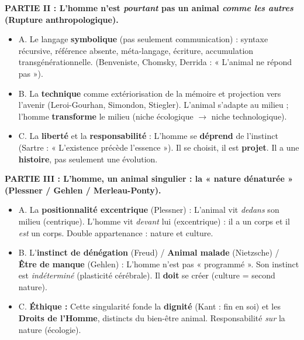 \documentclass[11pt]{article}
\begin{document}
\begin{exoresolu}
\textbf{PARTIE II : L'homme n'est \emph{pourtant} pas un animal \emph{comme les autres} (Rupture anthropologique).}
\begin{itemize}
    \item A. Le langage \textbf{symbolique} (pas seulement communication) : syntaxe récursive, référence absente, méta-langage, écriture, accumulation transgénérationnelle. (Benveniste, Chomsky, Derrida : « L'animal ne répond pas »).
    \item B. La \textbf{technique} comme extériorisation de la mémoire et projection vers l'avenir (Leroi-Gourhan, Simondon, Stiegler). L'animal s'adapte au milieu ; l'homme \textbf{transforme} le milieu (niche écologique $\rightarrow$ niche technologique).
    \item C. La \textbf{liberté} et la \textbf{responsabilité} : L'homme se \textbf{déprend} de l'instinct (Sartre : « L'existence précède l'essence »). Il se choisit, il est \textbf{projet}. Il a une \textbf{histoire}, pas seulement une évolution.
\end{itemize}

\textbf{PARTIE III : L'homme, un animal \textbf{singulier} : la « nature dénaturée » (Plessner / Gehlen / Merleau-Ponty).}
\begin{itemize}
    \item A. La \textbf{positionnalité excentrique} (Plessner) : L'animal vit \emph{dedans} son milieu (centrique). L'homme vit \emph{devant} lui (excentrique) : il a un corps et il \emph{est} un corps. Double appartenance : nature et culture.
    \item B. L'\textbf{instinct de dénégation} (Freud) / \textbf{Animal malade} (Nietzsche) / \textbf{Être de manque} (Gehlen) : L'homme n'est pas « programmé ». Son instinct est \emph{indéterminé} (plasticité cérébrale). Il \textbf{doit} se créer (culture = second nature).
    \item C. \textbf{Éthique :} Cette singularité fonde la \textbf{dignité} (Kant : fin en soi) et les \textbf{Droits de l'Homme}, distincts du bien-être animal. Responsabilité \emph{sur} la nature (écologie).
\end{itemize}


\end{exoresolu}
\end{document}
